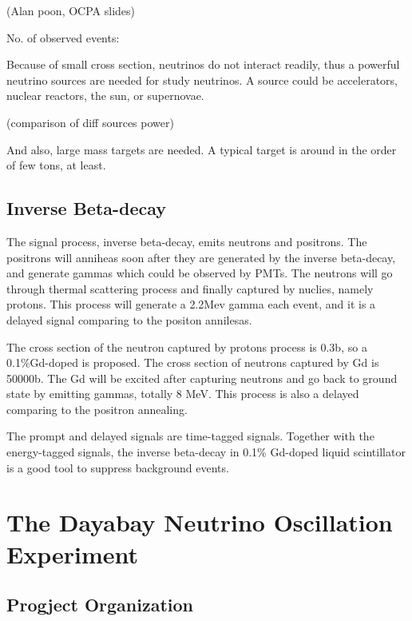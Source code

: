 (Alan poon, OCPA slides)

No. of observed events:

Because of small cross section, neutrinos do not interact readily, thus
a powerful neutrino sources are needed for study neutrinos. A source could be
accelerators, nuclear reactors, the sun, or supernovae.

(comparison of diff sources power)

And also, large mass targets are needed. A typical target is around in the order
of few tons, at least.





\subsection{Inverse Beta-decay}


The signal process, inverse beta-decay, emits neutrons and positrons.
The positrons will anniheas soon after they are generated by the inverse beta-decay,
and generate gammas which could be observed by PMTs. The neutrons will go through
thermal scattering process and finally captured by nuclies, namely protons. This
process will generate a 2.2Mev gamma each event, and it is a delayed signal comparing
to the positon annilesas.

The cross section of the neutron captured by protons process is 0.3b, so a 0.1\%Gd-doped
is proposed. The cross section of neutrons captured by Gd is 50000b. The Gd will be excited
after capturing neutrons and go back to ground state by emitting gammas, totally 8 MeV. This
process is also a delayed comparing to the positron annealing.


The prompt and delayed signals are time-tagged signals.
Together with the energy-tagged signals, the inverse beta-decay
in 0.1\% Gd-doped liquid scintillator is a good tool to suppress
background events.







\section{The Dayabay Neutrino Oscillation Experiment}



\subsection{Progject Organization}

